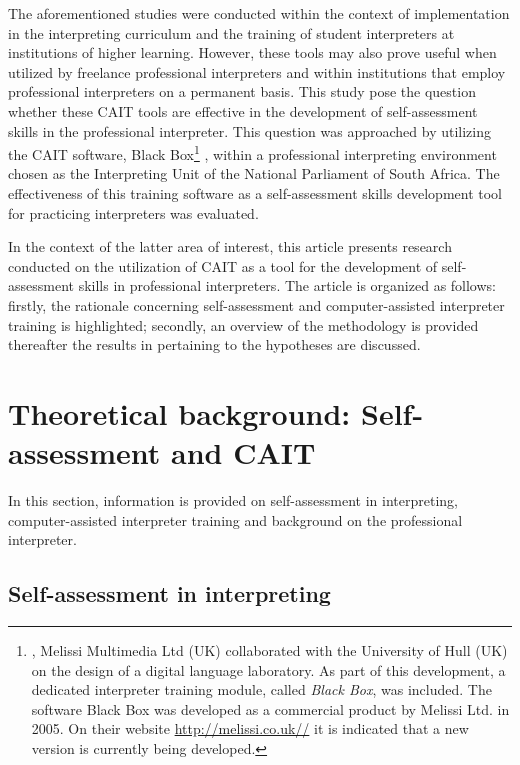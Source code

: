 \documentclass[output=paper]{langsci/langscibook}
\begin{document}
The aforementioned studies were conducted within the context of implementation in the interpreting curriculum and the training of student interpreters at institutions of higher learning. However, these tools may also prove useful when utilized by freelance professional interpreters and within institutions that employ professional interpreters on a permanent basis. This study pose the question whether these CAIT tools are effective in the development of self-assessment skills in the professional interpreter. This question was approached by utilizing the CAIT software, Black Box\footnote{\citealt{In2002}, Melissi Multimedia Ltd (UK) collaborated with the University of Hull (UK) on the design of a digital language laboratory. As part of this development, a dedicated interpreter training module, called \textit{Black Box}, was included. The software Black Box was developed as a commercial product by Melissi Ltd. in 2005. On their website \href{file:///home/felix/Github/209/orig/ http://melissi.co.uk//}{{} }\href{file:///home/felix/Github/209/orig/ http://melissi.co.uk//}{{http://melissi.co.uk//}} it is indicated that a new version is currently being developed.} , within a professional interpreting environment chosen as the Interpreting Unit of the National Parliament of South Africa. The effectiveness of this training software as a self-assessment skills development tool for practicing interpreters was evaluated. 

In the context of the latter area of interest, this article presents research conducted on the utilization of CAIT as a tool for the development of self-assessment skills in professional interpreters. The article is organized as follows: firstly, the rationale concerning self-assessment and computer-assisted interpreter training is highlighted; secondly, an overview of the methodology is provided thereafter the results in pertaining to the hypotheses are discussed.

\section{Theoretical background: Self-assessment and CAIT}

In this section, information is provided on self-assessment in interpreting, computer-assisted interpreter training and background on the professional interpreter.

\subsection{Self-assessment in interpreting}
\end{document}
